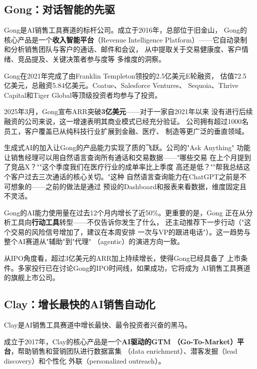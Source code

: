 \subsection{Gong：对话智能的先驱}
\label{subsec:gong}

Gong是AI销售工具赛道的标杆公司。成立于2016年，总部位于旧金山，
Gong的核心产品是一个\textbf{收入智能平台}（Revenue Intelligence
Platform）——它自动录制和分析销售团队与客户的通话、邮件和会议，
从中提取关于交易健康度、客户情绪、竞品提及、关键决策者参与度等
多维度的洞察。

Gong在2021年完成了由Franklin Templeton领投的2.5亿美元E轮融资，
估值72.5亿美元，总融资5.84亿美元。Coatue、Salesforce Ventures、
Sequoia、Thrive Capital和Tiger Global等顶级投资者均参与了投资。

2025年3月，Gong宣布ARR突破\textbf{3亿美元}——对于一家自2021年以来
没有进行后续融资的公司来说，这一增速表明其商业模式已经充分验证。
公司拥有超过1000名员工，客户覆盖已从纯科技行业扩展到金融、医疗、
制造等更广泛的垂直领域。

生成式AI的加入让Gong的产品能力实现了质的飞跃。公司的"Ask Anything"
功能让销售经理可以用自然语言查询所有通话和交易数据——"哪些交易
在上个月提到了竞品X？""这个季度我们在医疗行业的成单率比上季度
高还是低？""帮我总结这个客户过去三次通话的核心关切。"这种
自然语言查询能力在ChatGPT之前是不可想象的——之前的做法是通过
预设的Dashboard和报表来看数据，维度固定且不灵活。

Gong的AI能力使用量在过去12个月内增长了近50\%。更重要的是，Gong
正在从分析工具向\textbf{行动工具}转型——不仅告诉你发生了什么，
还主动推荐下一步行动（"这个交易的风险信号增加了，建议在本周安排
一次与VP的跟进电话"）。这一趋势与整个AI赛道从"辅助"到"代理"
（agentic）的演进方向一致。

从IPO角度看，超过3亿美元的ARR加上持续增长，使得Gong已经具备了
上市条件。多家投行已在讨论Gong的IPO时间线，如果成功，它将成为
AI销售工具赛道的旗舰上市公司。

\subsection{Clay：增长最快的AI销售自动化}
\label{subsec:clay}

Clay是AI销售工具赛道中增长最快、最令投资者兴奋的黑马。

成立于2017年，Clay的核心产品是一个\textbf{AI驱动的GTM
（Go-To-Market）平台}，帮助销售和营销团队进行数据富集
（data enrichment）、潜客发掘（lead discovery）和个性化
外联（personalized outreach）。

